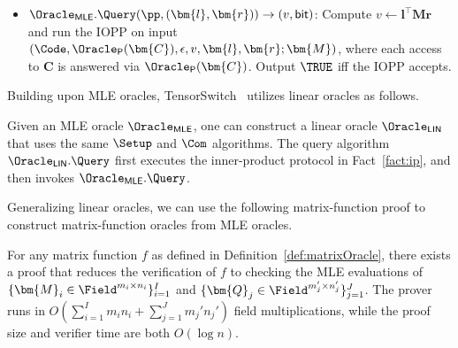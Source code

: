 \begin{lemma}
\begin{itemize}
    \item $\Oracle_{\mathsf{MLE}}.\Query(\pp, (\bm{l},\bm{r})) \to (v,\mathsf{bit})$:  
    Compute $v \leftarrow \bm{l}^{\top}\bm{M}\bm{r}$ and run the IOPP on input  
    $(\Code, \Oracle_{\mathsf{P}}(\bm{C}), \epsilon, v, \bm{l}, \bm{r}; \bm{M})$, 
    where each access to $\bm{C}$ is answered via $\Oracle_{\mathsf{P}}(\bm{C})$.  
    Output $\TRUE$ iff the IOPP accepts.
\end{itemize}
\end{lemma}

Building upon MLE oracles, TensorSwitch~\cite{iacr/BunzFRW25} utilizes linear oracles as follows.

\begin{lemma}
\label{lemma:oracleLinear}
Given an MLE oracle $\Oracle_{\mathsf{MLE}}$, one can construct a linear oracle
$\Oracle_{\mathsf{LIN}}$ that uses the same $\Setup$ and $\Com$ algorithms.
The query algorithm $\Oracle_{\mathsf{LIN}}.\Query$ first executes the
inner-product protocol in Fact~\ref{fact:ip}, and then invokes
$\Oracle_{\mathsf{MLE}}.\Query$.
\end{lemma}

Generalizing linear oracles, we can use the following
matrix-function proof to construct matrix-function oracles from MLE oracles.

\begin{fact}
\label{fact:matrixproof}
For any matrix function $f$ as defined in Definition~\ref{def:matrixOracle},
there exists a proof that reduces the verification of $f$ to checking the MLE
evaluations of $\{\bm{M}_i \in \Field^{m_i\times n_i}\}_{i=1}^I$ and $\{\bm{Q}_j \in \Field^{m_j'\times n_j'}\}_{j=1}^J$.
The prover runs in
$O\!\left(\sum_{i=1}^I m_i n_i + \sum_{j=1}^J m_j' n_j'\right)$ field multiplications,
while the proof size and verifier time are both $O(\log n)$.
\end{fact}

